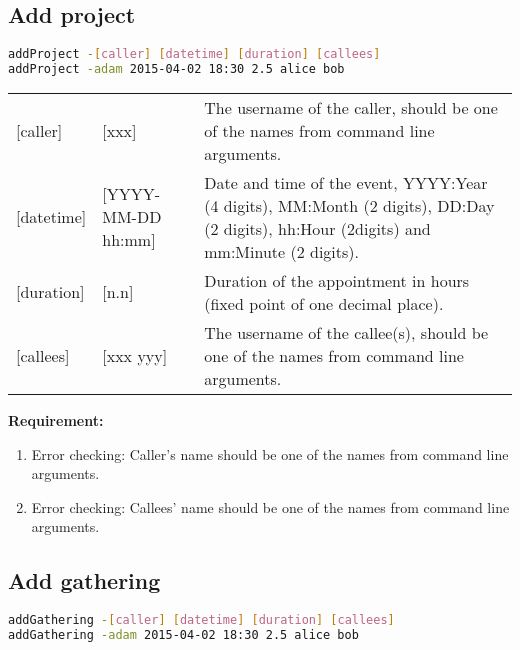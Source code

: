 \documentclass[12pt,a4paper]{report}
\begin{document}
\subsection{Add project}
\begin{lstlisting}[language=bash,basicstyle=\ttfamily,keywordstyle=\bfseries]
addProject -[caller] [datetime] [duration] [callees]
addProject -adam 2015-04-02 18:30 2.5 alice bob
\end{lstlisting}

\begin{table}[h]
\begin{tabular}{lll}
{[}caller{]} & {[}xxx{]} & The username of the caller, should be one of the names from command line arguments. \\
{[}datetime{]} & {[}YYYY-MM-DD hh:mm{]} & \parbox[t]{15cm}{Date and time of the event, YYYY:Year (4 digits), MM:Month (2 digits), DD:Day (2 digits), hh:Hour (2digits) and mm:Minute (2 digits).} \\
{[}duration{]}  & {[}n.n{]} & Duration of the appointment in hours (fixed point of one decimal place). \\
{[}callees{]}  & {[}xxx yyy{]} & The username of the callee(s), should be one of the names from command line arguments.
\end{tabular}
\end{table}

\textbf{Requirement:}
\begin{enumerate}
\item Error checking: Caller's name should be one of the names from command line arguments.
\item Error checking: Callees' name should be one of the names from command line arguments.
\end{enumerate}

\subsection{Add gathering}
\begin{lstlisting}[language=bash,basicstyle=\ttfamily,keywordstyle=\bfseries]
addGathering -[caller] [datetime] [duration] [callees]
addGathering -adam 2015-04-02 18:30 2.5 alice bob
\end{lstlisting}
\end{document}
